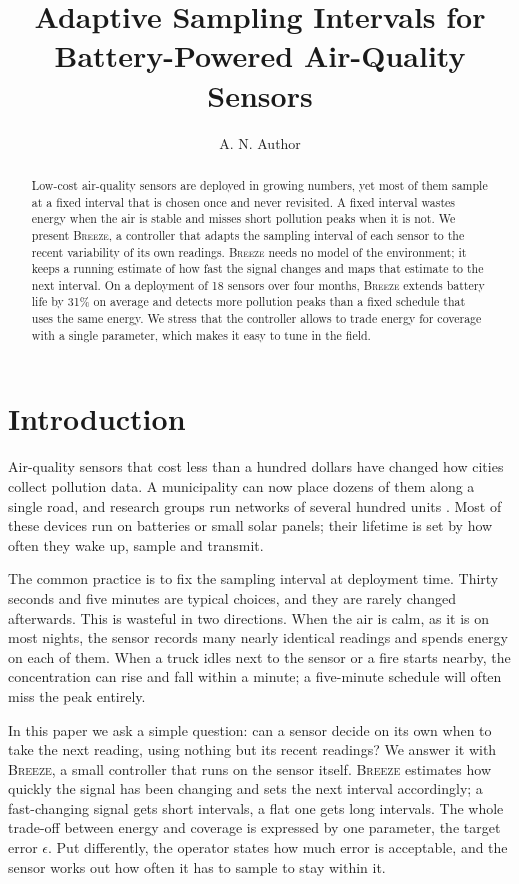 \documentclass{article}
\title{Adaptive Sampling Intervals for Battery-Powered Air-Quality Sensors}
\author{A. N. Author}
\date{}
\newcommand{\sys}{\textsc{Breeze}\xspace}
\begin{document}
\maketitle

\begin{abstract}

Low-cost air-quality sensors are deployed in growing numbers, yet most of
them sample at a fixed interval that is chosen once and never revisited. A
fixed interval wastes energy when the air is stable and misses short
pollution peaks when it is not. We present \sys, a controller that adapts
the sampling interval of each sensor to the recent variability of its own
readings. \sys needs no model of the environment; it keeps a running
estimate of how fast the signal changes and maps that estimate to the next
interval. On a deployment of 18 sensors over four months, \sys extends
battery life by 31\% on average and detects more pollution peaks than a
fixed schedule that uses the same energy. We stress that the controller
allows to trade energy for coverage with a single parameter, which makes it
easy to tune in the field.

\end{abstract}

\section{Introduction}

Air-quality sensors that cost less than a hundred dollars have changed how
cities collect pollution data. A municipality can now place dozens of them
along a single road, and research groups run networks of several hundred
units \citep{kumar2015rise,morawska2018applications}. Most of these devices
run on batteries or small solar panels; their lifetime is set by how often
they wake up, sample and transmit.

The common practice is to fix the sampling interval at deployment time.
Thirty seconds and five minutes are typical choices, and they are rarely
changed afterwards. This is wasteful in two directions. When the air is
calm, as it is on most nights, the sensor records many nearly identical
readings and spends energy on each of them. When a truck idles next to the
sensor or a fire starts nearby, the concentration can rise and fall within a
minute; a five-minute schedule will often miss the peak entirely.

In this paper we ask a simple question: can a sensor decide on its own when
to take the next reading, using nothing but its recent readings? We answer
it with \sys, a small controller that runs on the sensor itself. \sys
estimates how quickly the signal has been changing and sets the next
interval accordingly; a fast-changing signal gets short intervals, a flat
one gets long intervals. The whole trade-off between energy and coverage is
expressed by one parameter, the target error $\epsilon$. Put differently,
the operator states how much error is acceptable, and the sensor works out
how often it has to sample to stay within it.
\end{document}
